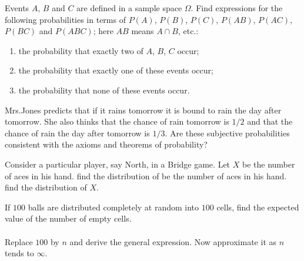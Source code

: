 \begin{problem}
  Events \(A\), \(B\) and \(C\) are defined in a sample space
  \(\Omega\). Find expressions for the following probabilities in terms of
  \(P(A)\), \(P(B)\), \(P(C)\), \(P(AB)\), \(P(AC)\), \(P(BC)\) and
  \(P(ABC)\); here \(AB\) means \(A\cap B\), etc.:
  \begin{enumerate}[label=(\alph*)]
  \item the probability that exactly two of \(A\), \(B\), \(C\) occur;
  \item the probability that exactly one of these events occur;
  \item the probability that none of these events occur.
  \end{enumerate}
\end{problem}
\begin{solution}

\end{solution}
\newpage

\begin{problem}
  Mrs.\@ Jones predicts that if it rains tomorrow it is bound to rain the
  day after tomorrow. She also thinks that the chance of rain tomorrow is
  \(1/2\) and that the chance of rain the day after tomorrow is
  \(1/3\). Are these subjective probabilities consistent with the axioms
  and theorems of probability?
\end{problem}
\begin{solution}

\end{solution}
\newpage

\begin{problem}[Handout 1, \# 16]
  Consider a particular player, say North, in a Bridge game. Let \(X\) be
  the number of aces in his hand. find the distribution of be the number of
  aces in his hand. find the distribution of \(X\).
\end{problem}
\begin{solution}

\end{solution}
\newpage

\begin{problem}[Handout 1, \# 20]
  If \(100\) balls are distributed completely at random into \(100\) cells,
  find the expected value of the number of empty cells.
  \\\\
  Replace \(100\) by \(n\) and derive the general expression. Now
  approximate it as \(n\) tends to \(\infty\).
\end{problem}
\begin{solution}
\end{solution}

